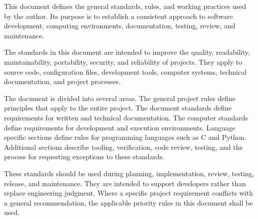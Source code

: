 This document defines the general standards, rules, and working practices used by the author. Its purpose is to establish a consistent approach to software development, computing environments, documentation, testing, review, and maintenance.

The standards in this document are intended to improve the quality, readability, maintainability, portability, security, and reliability of
projects. They apply to source code, configuration files, development tools, computer systems, technical documentation, and project processes.

The document is divided into several areas. The general project rules define principles that apply to the entire project. The document standards define requirements for written and technical documentation. The computer standards define requirements for development and execution environments. Language specific sections define rules for programming languages such as C and Python. Additional sections describe tooling, verification, code review, testing, and the process for requesting exceptions to these standards.

These standards should be used during planning, implementation, review, testing, release, and maintenance. They are intended to support developers rather than replace engineering judgment. Where a specific project requirement conflicts with a general recommendation, the applicable priority rules in this document shall be used.